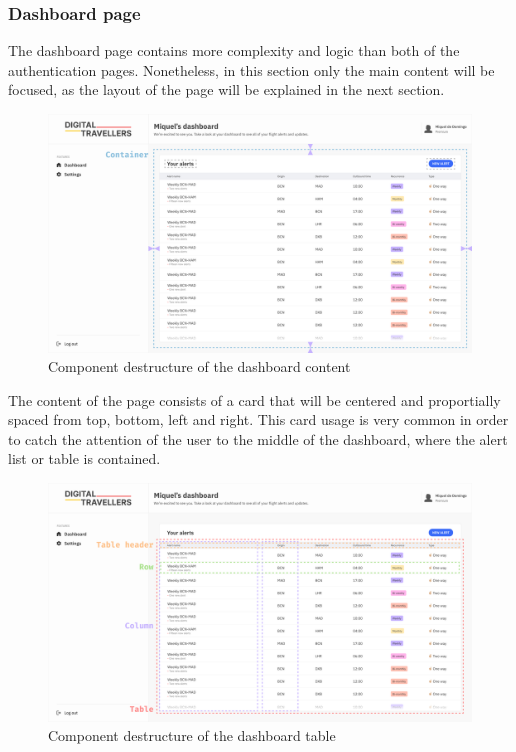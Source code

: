 \documentclass[./memory.tex]{subfiles}
\begin{document}
\subsubsection{Dashboard page}
The dashboard page contains more complexity and logic than both of the
authentication pages. Nonetheless, in this section only the main content will be
focused, as the layout of the page will be explained in the next section.
\begin{figure}[H]
	\centering
	\includegraphics[width=\textwidth]{./assets/designs/dashboard-web-container.png}
	\caption{Component destructure of the dashboard content}
\end{figure}
The content of the page consists of a card that will be centered and
proportially spaced from top, bottom, left and right. This card usage is very
common in order to catch the attention of the user to the middle of the
dashboard, where the alert list or table is contained.
\begin{figure}[H]
	\centering
	\includegraphics[width=\textwidth]{./assets/designs/dashboard-web-table.png}
	\caption{Component destructure of the dashboard table}
\end{figure}
\end{document}

